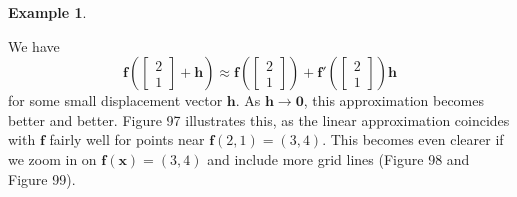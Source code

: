 \documentclass{article}
\newcommand{\x}{\mathbf{x}}
\newcommand{\f}{\mathbf{f}}
\newcommand{\h}{\mathbf{h}}
\newcommand{\ze}{\mathbf{0}}
\theoremstyle{definition}
\newtheorem{example}{Example}[section]
\begin{document}
\begin{example}
\begin{figure}[h!]
	\centering
	\caption{}
\end{figure}	
We have $$  \f\left(\begin{bmatrix}
	2\\1
\end{bmatrix}+\h\right) \approx \f\left( \begin{bmatrix}
2\\1
\end{bmatrix}\right) + \f' \left(\begin{bmatrix}
	2\\1
\end{bmatrix}\right)\h$$ for some small displacement vector $ \h $. As $ \h \to \ze $, this approximation becomes better and better. Figure 97 illustrates this, as the linear approximation coincides with $ \f $ fairly well for points near $  \f(2,1) = (3,4) $. This becomes even clearer if we zoom in on $ \f(\x)=(3,4) $ and include more grid lines (Figure 98 and Figure 99). 
\begin{figure}[h!]
	\centering
\end{figure}
\end{example}
\end{document}
